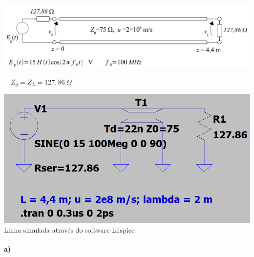 \documentclass[12pt,a4paper]{article}
\begin{document}
\begin{center}
    \includegraphics[scale=0.6]{Q2 line.png}
\end{center}
\ \ $Z_g=Z_L=127,86\ \Omega$
\begin{center}
    \includegraphics[scale=0.6]{Q2 simu.png}\\
    
    \small{Linha simulada através do software LTspice}
\end{center}

\paragraph{a)}
\end{document}
